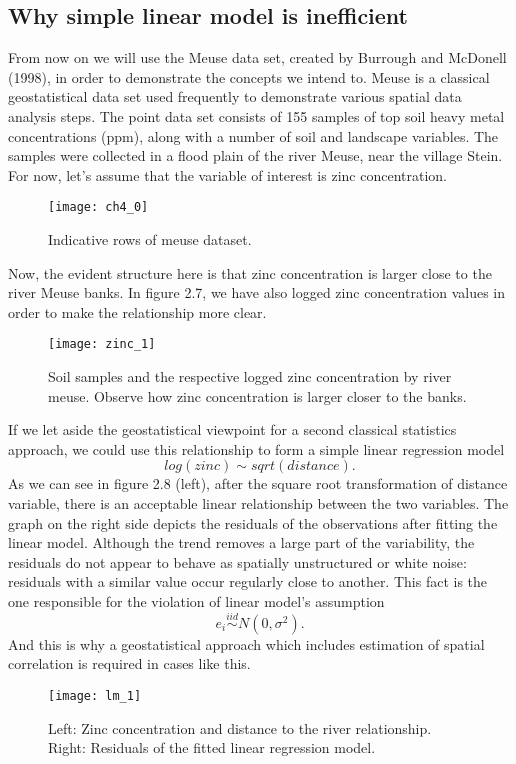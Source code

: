 \documentclass[12pt,a4paper,oneside]{book}
\theoremstyle{plain}
\theoremstyle{definition}
\begin{document}
{\subsection{Why simple linear model is inefficient}
From now on we will use the Meuse data set, created by Burrough and McDonell (1998), in order to demonstrate the concepts we intend to. Meuse is a classical geostatistical data set used frequently to demonstrate various spatial data analysis steps. The point data set consists of 155 samples of top soil heavy metal concentrations (ppm), along with a number of soil and landscape variables. The samples were collected in a flood plain of the river Meuse, near the village Stein. For now, let's assume that the variable of interest is zinc concentration. 
\vspace{3mm}\newline
\begin{figure}[h]
\begin{center}
\texttt{[image: ch4\_0]}
\caption{Indicative rows of meuse dataset.}
\end{center}
\end{figure}

\vspace{2mm}
\noindent
Now, the evident structure here is that zinc concentration is larger close to the river Meuse banks. In figure 2.7, we have also logged zinc concentration values in order to make the relationship more clear. 
\begin{figure}[h]
\begin{center}
\texttt{[image: zinc\_1]}
\caption{Soil samples and the respective logged zinc concentration by river meuse. Observe how zinc concentration is larger closer to the banks.}
\end{center}
\end{figure}
If we let aside the geostatistical viewpoint for a second  classical statistics approach, we could use this relationship to form a simple linear regression model 
$$log(zinc)\sim sqrt(distance).$$  As we can see in figure 2.8 (left), after the square root transformation of distance variable, there is an acceptable linear relationship between the two variables. The graph on the right side depicts the residuals of the observations after fitting the linear model. Although the trend removes a large part of the variability, the residuals do not appear to behave as spatially unstructured or white noise: residuals with a similar value occur regularly close to another. This fact is the one responsible for the violation of linear model's assumption $$e_i \overset{iid}{\sim} N(0,\sigma^2).$$ 
And this is why a geostatistical approach which includes estimation of spatial correlation is required in cases like this.
\begin{figure}[h]
\begin{center}
\texttt{[image: lm\_1]}
\caption{Left: Zinc concentration and distance to the river relationship. Right: Residuals of the fitted linear regression model.}
\end{center}
\end{figure}

}
\end{document}
